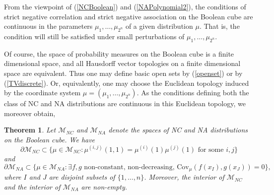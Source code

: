 \documentclass[11pt]{article}
\newcommand{\m}{\mathcal{M}}
\newcommand{\C}{\text{Cov}}
\newtheorem{thm}{Theorem}
\begin{document}
From the viewpoint of (\ref{NCBoolean}) and (\ref{NAPolynomial2}), 
the conditions of strict negative correlation and strict negative association on the 
Boolean cube are continuous in the parameters $\mu_1,\dots, \mu_{2^n}$
of a given distribution $\mu$. That is, the condition will still be satisfied
under small perturbations of $\mu_1,\dots, \mu_{2^n}$. 

Of course, the space of probability measures on the Boolean cube is a finite dimensional
space, and all Hausdorff vector topologies on a finite dimensional space are equivalent. Thus
one may define basic open sets by (\ref{openset}) or by (\ref{TVdiscrete}).
Or, equivalently, one may choose the Euclidean topology induced by the coordinate
system $\mu=(\mu_1,\dots,\mu_{2^n})$. 
As the conditions
defining both the class of NC and NA distributions are continuous in
this Euclidean topology, we moreover obtain,
\begin{thm}
Let $\m_{NC}$ and $\m_{NA}$ denote the spaces of NC and NA
distributions on the Boolean cube. We have
\[
\partial\m_{NC}\subset \{ \mu \in \m_{NC} : \mu^{(i,j)}(1,1) = \mu^{(i)}(1)\mu^{(j)}(1)
\text{ for some } i,j\}
\]
and
\[
\partial\m_{NA} \subset \{ \mu \in \m_{NA} : \exists f,g \text{ non-constant, non-decreasing, } \C_{\mu}(f(x_I),g(x_J)) = 0 \},
\]
where $I$ and $J$ are disjoint subsets of $\{1,\dots, n\}$.
Moreover, the interior of $\m_{NC}$ and the interior of $\m_{NA}$ are non-empty.
\end{thm}
\end{document}
